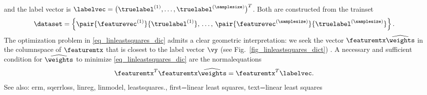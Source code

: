 {{  and the \gls{label} \gls{vector} is 
  $\labelvec= \big(\truelabel^{(1)},\ldots,\truelabel^{(\samplesize)}\big)^{T}$. 
  Both are constructed from the \gls{trainset}
  $$\dataset = \left\{ \pair{\featurevec^{(1)}}{\truelabel^{(1)}}, \,\ldots, \,
 			   \pair{\featurevec^{(\samplesize)}}{\truelabel^{(\samplesize)}} \right\}.$$ 
  The optimization problem in \eqref{eq_linleastsquares_dic} admits a clear 
  geometric interpretation: we seek the vector $\featuremtx \widehat{\weights}$ in the 
  \gls{columnspace} of $\featuremtx$ that is closest to the label vector $\vy$ 
  (see Fig.~\ref{fig_linleastsquares_dict}) \cite[Ch. 8]{BoydConvexBook}. 
  A necessary and sufficient condition for $\widehat{\weights}$ to minimize 
  \eqref{eq_linleastsquares_dic} are the \gls{normalequations} 
  $$ \featuremtx^{T} \featuremtx \widehat{\weights} = \featuremtx^{T} \labelvec. $$
		See also: \gls{erm}, \gls{sqerrloss}, \gls{linreg}, \gls{linmodel}, \gls{leastsquares}.},
	first={linear least squares},
	text={linear least squares}
}

